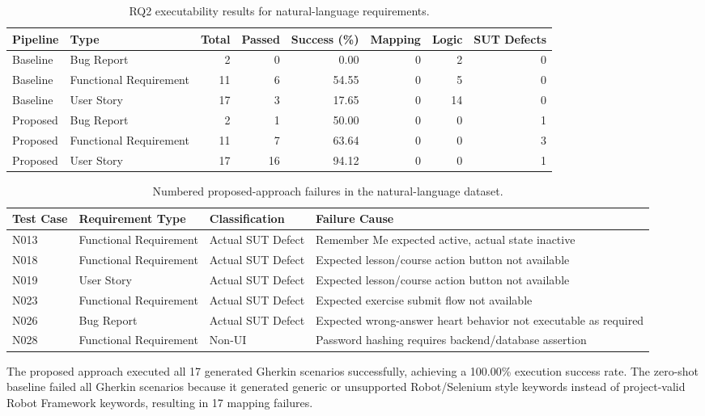 \begin{table}[htbp]
\centering
\caption{RQ2 executability results for natural-language requirements.}
\label{tab:rq2_natural_executability}
\begin{tabular}{llrrrrrr}
\toprule
Pipeline & Type & Total & Passed & Success (\%) & Mapping & Logic & SUT Defects \\
\midrule
Baseline & Bug Report & 2 & 0 & 0.00 & 0 & 2 & 0 \\
Baseline & Functional Requirement & 11 & 6 & 54.55 & 0 & 5 & 0 \\
Baseline & User Story & 17 & 3 & 17.65 & 0 & 14 & 0 \\
Proposed & Bug Report & 2 & 1 & 50.00 & 0 & 0 & 1 \\
Proposed & Functional Requirement & 11 & 7 & 63.64 & 0 & 0 & 3 \\
Proposed & User Story & 17 & 16 & 94.12 & 0 & 0 & 1 \\
\bottomrule
\end{tabular}
\end{table}

\begin{table}[htbp]
\centering
\caption{Numbered proposed-approach failures in the natural-language dataset.}
\label{tab:rq2_proposed_natural_failures}
\begin{tabular}{llll}
\toprule
Test Case & Requirement Type & Classification & Failure Cause \\
\midrule
N013 & Functional Requirement & Actual SUT Defect & Remember Me expected active, actual state inactive \\
N018 & Functional Requirement & Actual SUT Defect & Expected lesson/course action button not available \\
N019 & User Story & Actual SUT Defect & Expected lesson/course action button not available \\
N023 & Functional Requirement & Actual SUT Defect & Expected exercise submit flow not available \\
N026 & Bug Report & Actual SUT Defect & Expected wrong-answer heart behavior not executable as required \\
N028 & Functional Requirement & Non-UI & Password hashing requires backend/database assertion \\
\bottomrule
\end{tabular}
\end{table}

The proposed approach executed all 17 generated Gherkin scenarios successfully,
achieving a 100.00\% execution success rate. The zero-shot baseline failed all
Gherkin scenarios because it generated generic or unsupported Robot/Selenium
style keywords instead of project-valid Robot Framework keywords, resulting in
17 mapping failures.

